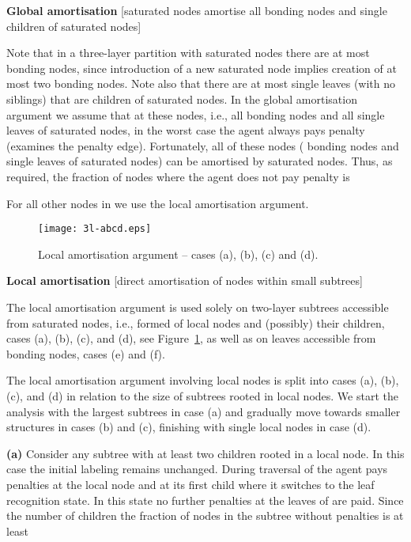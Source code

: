 \documentclass[11pt,envcountsame,oribibl]{llncs}
\begin{document}
\vspace*{0.2cm}
\noindent
{\bf Global amortisation} [saturated nodes amortise all bonding nodes
and single children
of saturated nodes]


Note that in a three-layer partition with  saturated nodes there are
at most  bonding nodes, since introduction of a new saturated node
implies creation of at most two bonding nodes.
Note also that there are at most  single leaves (with no siblings)
that are children of
saturated nodes. In the global amortisation argument we assume that at
these nodes, i.e., all bonding nodes and all single leaves of
saturated nodes, in the worst case the agent always pays
penalty (examines the penalty edge).
Fortunately, all of these  nodes ( bonding nodes and 
single leaves
of saturated nodes) can be amortised by  saturated nodes. Thus, as
required,
the fraction of nodes where the agent does not pay penalty is

For all other nodes in  we use the local amortisation argument.

\begin{figure}
\begin{center}
\texttt{[image: 3l-abcd.eps]}
\end{center}
\caption{Local amortisation argument -- cases (a), (b), (c) and (d).\label{f:abcd}}
\end{figure}


\vspace*{0.2cm}
\noindent
{\bf Local amortisation} [direct amortisation of nodes within small
subtrees]


\noindent
The local amortisation argument is used solely on two-layer subtrees
accessible
from saturated nodes, i.e., formed of local nodes and (possibly) their
children,
cases (a), (b), (c), and (d), see Figure~\ref{f:abcd},
as well as on leaves accessible from bonding nodes, cases (e) and (f).



The local amortisation argument involving local nodes is split into cases
(a), (b), (c), and (d) in relation to the size of subtrees rooted in
local nodes.
We start the analysis with the largest subtrees in case (a) and gradually
move towards smaller structures in cases (b) and (c), finishing with single
local nodes in case (d).

\noindent
{\bf (a)} Consider any subtree  with at least two children rooted in
a local node. In this case the initial labeling remains unchanged.
During traversal of  the agent pays penalties at the local node and
at its
first child where it switches to the leaf recognition state. In this state
no further penalties at the leaves of  are paid.
Since the number of children  the fraction of nodes in the subtree
without penalties is at least 
\end{document}
